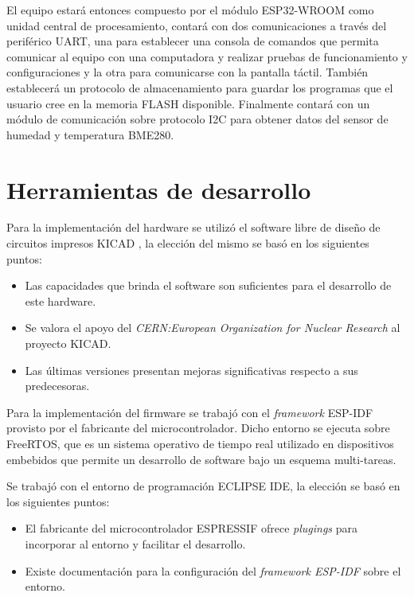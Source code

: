 El equipo estará entonces compuesto por el módulo ESP32-WROOM como unidad central de procesamiento, contará con dos comunicaciones a través del periférico UART, una para establecer una consola de comandos que permita comunicar al equipo con una computadora y realizar pruebas de funcionamiento y configuraciones y la otra para comunicarse con la pantalla táctil. También establecerá un protocolo de almacenamiento para guardar los programas que el usuario cree en la memoria FLASH disponible. Finalmente contará con un módulo de comunicación sobre protocolo I2C para obtener datos del sensor de humedad y temperatura BME280.  


\section{Herramientas de desarrollo}

Para la implementación del hardware se utilizó el software libre de diseño de circuitos impresos KICAD \citep{web_kicad}, la elección del mismo se basó en los siguientes puntos:

\begin{itemize}
\item Las capacidades que brinda el software son suficientes para el desarrollo de este hardware.
\item Se valora el apoyo del \textit{CERN:European Organization for Nuclear Research} \citep{1_nota_web_kicad_cern} al proyecto KICAD.
\item Las últimas versiones presentan mejoras significativas respecto a sus predecesoras.
\end{itemize}


Para la implementación del firmware se trabajó con el \textit{framework} ESP-IDF \citep{web_esp_idf} provisto por el fabricante del microcontrolador. Dicho entorno se ejecuta sobre FreeRTOS, que es un sistema operativo de tiempo real utilizado en dispositivos embebidos que permite un desarrollo de software bajo un esquema multi-tareas.

Se trabajó con el entorno de programación ECLIPSE IDE, la elección se basó en los siguientes puntos:
\begin{itemize}
\item El fabricante del microcontrolador ESPRESSIF ofrece \textit{plugings} para incorporar al entorno y facilitar el desarrollo. 
\item Existe documentación para la configuración del \textit{framework ESP-IDF} \citep{web_esp_idf_eclipse} sobre el entorno.
\end{itemize}
